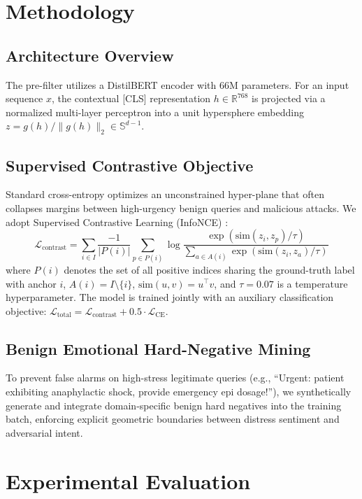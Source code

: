 \documentclass[conference]{IEEEtran}
\begin{document}
\section{Methodology}
\subsection{Architecture Overview}
The pre-filter utilizes a DistilBERT encoder \cite{sanh2021distilbert} with 66M parameters. For an input sequence $x$, the contextual [CLS] representation $h \in \mathbb{R}^{768}$ is projected via a normalized multi-layer perceptron into a unit hypersphere embedding $z = g(h) / \|g(h)\|_2 \in \mathbb{S}^{d-1}$.

\subsection{Supervised Contrastive Objective}
Standard cross-entropy optimizes an unconstrained hyper-plane that often collapses margins between high-urgency benign queries and malicious attacks. We adopt Supervised Contrastive Learning (InfoNCE) \cite{khosla2023supervised}:
\begin{equation}
\mathcal{L}_{\text{contrast}} = \sum_{i \in I} \frac{-1}{|P(i)|} \sum_{p \in P(i)} \log \frac{\exp(\text{sim}(z_i, z_p) / \tau)}{\sum_{a \in A(i)} \exp(\text{sim}(z_i, z_a) / \tau)}
\end{equation}
where $P(i)$ denotes the set of all positive indices sharing the ground-truth label with anchor $i$, $A(i) = I \setminus \{i\}$, $\text{sim}(u, v) = u^\top v$, and $\tau = 0.07$ is a temperature hyperparameter. The model is trained jointly with an auxiliary classification objective: $\mathcal{L}_{\text{total}} = \mathcal{L}_{\text{contrast}} + 0.5 \cdot \mathcal{L}_{\text{CE}}$.

\subsection{Benign Emotional Hard-Negative Mining}
To prevent false alarms on high-stress legitimate queries (e.g., ``Urgent: patient exhibiting anaphylactic shock, provide emergency epi dosage!''), we synthetically generate and integrate domain-specific benign hard negatives into the training batch, enforcing explicit geometric boundaries between distress sentiment and adversarial intent.

\section{Experimental Evaluation}
\end{document}
